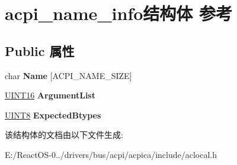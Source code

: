 \hypertarget{structacpi__name__info}{}\section{acpi\+\_\+name\+\_\+info结构体 参考}
\label{structacpi__name__info}
\subsection*{Public 属性}
\begin{DoxyCompactItemize}
\item 
\mbox{\label{structacpi__name__info_a99a016dbd9e15b7ba7fbf8f3eb387914}} 
char {\bfseries Name} \mbox{[}A\+C\+P\+I\+\_\+\+N\+A\+M\+E\+\_\+\+S\+I\+ZE\mbox{]}
\item 
\mbox{\label{structacpi__name__info_a8c7eab4357e0945f2fffb75df08ecfda}} 
\hyperlink{_processor_bind_8h_a09f1a1fb2293e33483cc8d44aefb1eb1}{U\+I\+N\+T16} {\bfseries Argument\+List}
\item 
\mbox{\label{structacpi__name__info_a0f9b862812db8672f9a2c3e9ab197278}} 
\hyperlink{_processor_bind_8h_ab27e9918b538ce9d8ca692479b375b6a}{U\+I\+N\+T8} {\bfseries Expected\+Btypes}
\end{DoxyCompactItemize}


该结构体的文档由以下文件生成\+:\begin{DoxyCompactItemize}
\item 
E\+:/\+React\+O\+S-\/0../drivers/bus/acpi/acpica/include/aclocal.\+h\end{DoxyCompactItemize}
